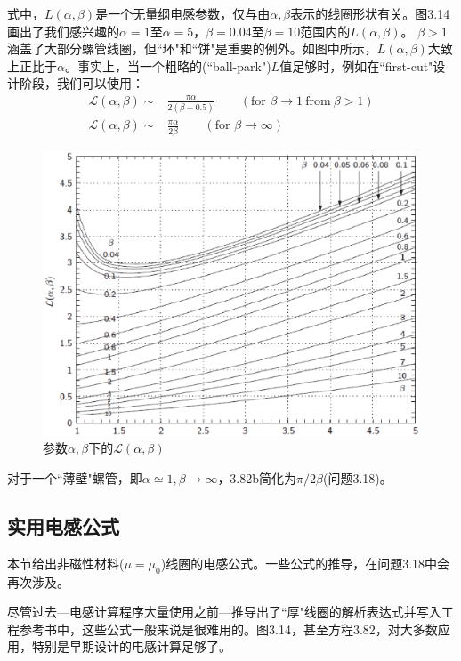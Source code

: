式中，$L(\alpha,\beta)$是一个无量纲电感参数，仅与由$\alpha,\beta$表示的线圈形状有关。图3.14画出了我们感兴趣的$\alpha=1$至$\alpha=5$，$\beta=0.04$至$\beta=10$范围内的$L(\alpha,\beta)$。
$\beta>1$涵盖了大部分螺管线圈，但``环"和``饼"是重要的例外。如图中所示，$L(\alpha,\beta)$大致上正比于$\alpha$。事实上，当一个粗略的(``ball-park")$L$值足够时，例如在``first-cut"设计阶段，我们可以使用：
\begin{subequations}
	\begin{align}
\mathcal{L}(\alpha,\beta)\sim&\frac{\pi\alpha}{2(\beta+0.5)} \qquad(\mbox{for } \beta\rightarrow 1\ \mbox{from}\ \beta>1)\\ 
\mathcal{L}(\alpha,\beta)\sim&\frac{\pi\alpha}{2\beta}\qquad (\mbox{for } \beta\rightarrow \infty)
	\end{align}
\end{subequations}

\begin{figure}[htbp]
  \centering
 \includegraphics[scale=0.6]{chpt3/figs/fig3.14.eps}
  \caption{参数$\alpha,\beta$下的$\mathcal{L}(\alpha,\beta)$}
\end{figure}

对于一个``薄壁"螺管，即$\alpha\simeq 1,\beta\rightarrow \infty$，3.82b简化为$\pi/2\beta$(问题3.18)。

\subsection{实用电感公式}
本节给出非磁性材料($\mu=\mu_0$)线圈的电感公式。一些公式的推导，在问题3.18中会再次涉及。

尽管过去---电感计算程序大量使用之前---推导出了``厚"线圈的解析表达式并写入工程参考书中，这些公式一般来说是很难用的。图3.14，甚至方程3.82，对大多数应用，特别是早期设计的电感计算足够了。


